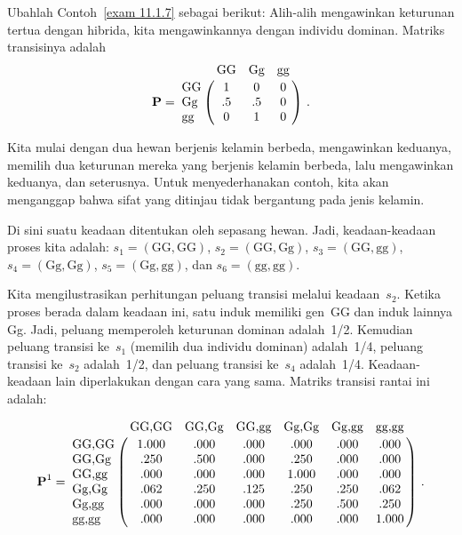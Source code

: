 \begin{example}\label{exam 11.1.8}
Ubahlah Contoh~\ref{exam 11.1.7} sebagai berikut: Alih-alih mengawinkan
keturunan tertua dengan hibrida, kita mengawinkannya dengan individu dominan.
Matriks transisinya adalah
$$
\mat{P} = \bordermatrix{
   & \mbox{GG} & \mbox{Gg} &\mbox{gg} \cr
\mbox{GG} &  1 &  0 &  0 \cr
\mbox{Gg} & .5 & .5 &  0 \cr
\mbox{gg} &  0 &  1 &  0}\ .
$$
\end{example}

\begin{example}\label{exam 11.1.9}
Kita mulai dengan dua hewan berjenis kelamin berbeda, mengawinkan keduanya,
memilih dua keturunan mereka yang berjenis kelamin berbeda, lalu mengawinkan
keduanya, dan seterusnya. Untuk menyederhanakan contoh, kita akan menganggap
bahwa sifat yang ditinjau tidak bergantung pada jenis kelamin.
\par
Di sini suatu keadaan ditentukan oleh sepasang hewan. Jadi, keadaan-keadaan
proses kita adalah: $s_1 = (\mbox{GG},\mbox{GG})$, $s_2 =
(\mbox{GG},\mbox{Gg})$, $s_3 = (\mbox{GG},\mbox{gg})$, $s_4 =
(\mbox{Gg},\mbox{Gg})$, $s_5 = (\mbox{Gg},\mbox{gg})$, dan $s_6 =
(\mbox{gg},\mbox{gg})$.
\par
Kita mengilustrasikan perhitungan peluang transisi melalui keadaan~$s_2$.
Ketika proses berada dalam keadaan ini, satu induk memiliki gen~GG dan induk
lainnya Gg. Jadi, peluang memperoleh keturunan dominan adalah~1/2. Kemudian
peluang transisi ke~$s_1$ (memilih dua individu dominan) adalah~1/4, peluang
transisi ke~$s_2$ adalah~1/2, dan peluang transisi ke~$s_4$ adalah~1/4.
Keadaan-keadaan lain diperlakukan dengan cara yang sama. Matriks transisi
rantai ini adalah:
\par

$$
{\mat{P}^1} = \bordermatrix{            
&\mbox{GG,GG}&\mbox{GG,Gg}&\mbox{GG,gg}&\mbox{Gg,Gg}&\mbox{Gg,gg}&\mbox{gg,gg}\cr
\mbox{GG,GG} & 1.000 & .000 &  .000 &  .000 &  .000 &  .000\cr
\mbox{GG,Gg} &  .250 & .500 &  .000 &  .250 &  .000 &  .000\cr
\mbox{GG,gg} &  .000 & .000 &  .000 & 1.000 &  .000 &  .000\cr
\mbox{Gg,Gg} &  .062 & .250 &  .125 &  .250 &  .250 &  .062\cr
\mbox{Gg,gg} &  .000 & .000 &  .000 &  .250 &  .500 &  .250\cr
\mbox{gg,gg} &  .000 & .000 &  .000 &  .000 &  .000 &  1.000}\ .
$$
 
\end{example}


